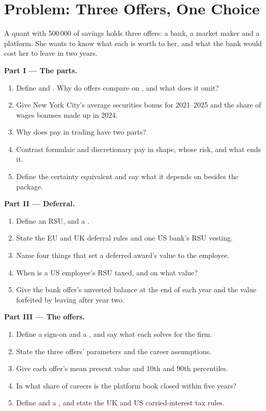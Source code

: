 \section{Problem: Three Offers, One Choice}

\begin{problem}\label{pb:in:how-pay-works:1}
A quant with 500\,000 of savings holds three offers: a bank, a market maker and a platform. She wants to know what each
is worth to her, and what the bank would cost her to leave in two years.

\medskip\noindent\textbf{Part I --- The parts.}
\begin{enumerate}
\item Define  and . Why do offers compare on , and what does it omit?
\item Give New York City's average securities bonus for 2021--2025 and the share of wages bonuses made up in 2024.
\item Why does pay in trading have two parts?
\item Contrast formulaic and discretionary pay in shape, whose risk, and what ends it.
\item Define the certainty equivalent and say what it depends on besides the package.
\end{enumerate}

\medskip\noindent\textbf{Part II --- Deferral.}
\begin{enumerate}[resume]
\item Define an RSU,  and a .
\item State the EU and UK deferral rules and one US bank's RSU vesting.
\item Name four things that set a deferred award's value to the employee.
\item When is a US employee's RSU taxed, and on what value?
\item Give the bank offer's unvested balance at the end of each year and the value forfeited by leaving after year two.
\end{enumerate}

\medskip\noindent\textbf{Part III --- The offers.}
\begin{enumerate}[resume]
\item Define a sign-on and a , and say what each solves for the firm.
\item State the three offers' parameters and the career assumptions.
\item Give each offer's mean present value and 10th and 90th percentiles.
\item In what share of careers is the platform book closed within five years?
\item Define  and a , and state the UK and US carried-interest tax rules.
\end{enumerate}


\end{problem}
